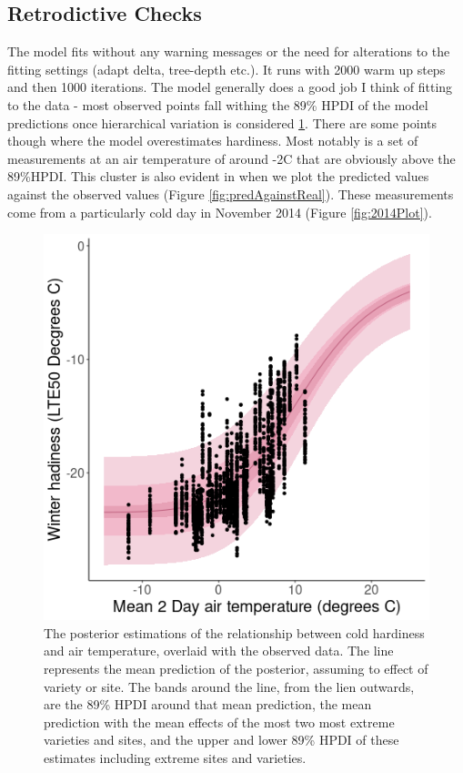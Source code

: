 \documentclass[11pt,letter]{article}
\begin{document}
\subsection{Retrodictive Checks}
The model fits without any warning messages or the need for alterations to the fitting settings (adapt delta, tree-depth etc.). It runs with 2000 warm up steps and then 1000 iterations. The model generally does a good job I think of fitting to the data - most observed points fall withing the 89\% HPDI of the model predictions once hierarchical variation is considered \ref{fig:predWithReal}. There are some points though where the model overestimates hardiness. Most notably is a set of measurements at an air temperature of around -2\textdegree C that are obviously above the 89\%HPDI.  This cluster is also evident in when we plot the predicted values against the observed values (Figure \ref{fig:predAgainstReal}). These measurements come from a particularly cold day in November 2014 (Figure \ref{fig:2014Plot}).    

\begin{figure}
  \includegraphics[scale = 0.5]{PredWithReal.png}
  \caption{The posterior estimations of the relationship between cold hardiness and air temperature, overlaid with the observed data. The line represents the mean prediction of the posterior, assuming to effect of variety or site. The bands around the line, from the lien outwards, are the 89\% HPDI around that mean prediction, the mean prediction with the mean effects of the most two most extreme varieties and sites, and the upper and lower 89\% HPDI of these estimates including extreme sites and varieties.}
  \label{fig:predWithReal}
\end{figure}
\end{document}
